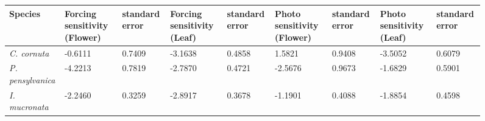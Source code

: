 \documentclass{article}\usepackage[]{graphicx}\usepackage[]{color}
\begin{document}
\begin{figure} [h!]
\begin{tabularx}{1.1\textwidth}{|l||X|X||X|X||X|X||X|X||}
\hline
Species & Forcing sensitivity (Flower)& standard error & Forcing sensitivity (Leaf)&standard error & Photo sensitivity (Flower)& standard error  & Photo sensitivity (Leaf)&standard error\\
\hline
\textit{C. cornuta} & -0.6111& 0.7409 & -3.1638 &0.4858 & 1.5821 & 0.9408  &-3.5052&0.6079\\
\hline
\textit{P. pensylvanica} & -4.2213 &0.7819&-2.7870&0.4721 &-2.5676&0.9673& -1.6829&0.5901\\
\hline
\textit{I. mucronata}& -2.2460&0.3259 &-2.8917&0.3678 &-1.1901&0.4088 &-1.8854&0.4598\\
\hline
\end{tabularx}
\end{figure}
\end{document}
